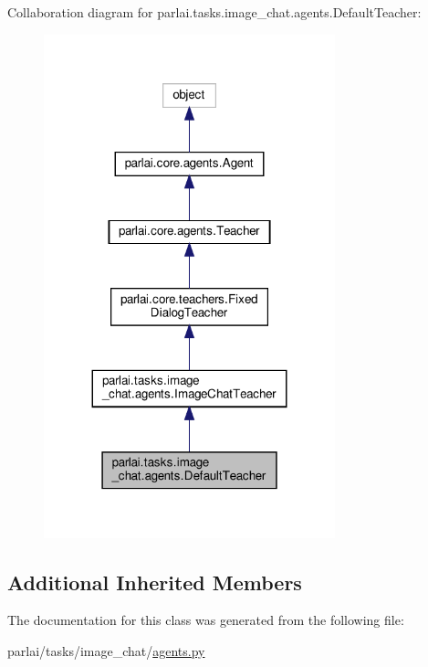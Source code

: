 Collaboration diagram for parlai.\+tasks.\+image\+\_\+chat.\+agents.\+Default\+Teacher\+:
\nopagebreak
\begin{figure}[H]
\begin{center}
\leavevmode
\includegraphics[width=239pt]{classparlai_1_1tasks_1_1image__chat_1_1agents_1_1DefaultTeacher__coll__graph}
\end{center}
\end{figure}
\subsection*{Additional Inherited Members}


The documentation for this class was generated from the following file\+:\begin{DoxyCompactItemize}
\item 
parlai/tasks/image\+\_\+chat/\hyperlink{parlai_2tasks_2image__chat_2agents_8py}{agents.\+py}\end{DoxyCompactItemize}
